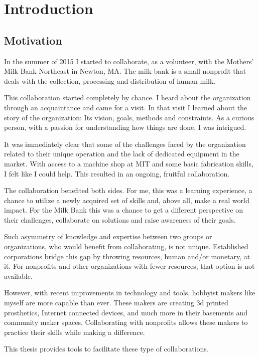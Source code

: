 \chapter{Introduction}
\label{chap_intro}

\section{Motivation}
In the summer of 2015 I started to collaborate, as a volunteer, with the Mothers’ Milk Bank Northeast in Newton, MA. The milk bank is a small nonprofit that deals with the collection, processing and distribution of human milk.

This collaboration started completely by chance. I heard about the organization through an acquaintance and came for a visit. In that visit I learned about the story of the organization: Its vision, goals, methods and constraints. As a curious person, with a passion for understanding how things are done, I was intrigued. 

It was immediately clear that some of the challenges faced by the organization related to their unique operation and the lack of dedicated equipment in the market. With access to a machine shop at MIT and some basic fabrication skills, I felt like I could help. This resulted in an ongoing, fruitful collaboration. 

The collaboration benefited both sides. For me, this was a learning experience, a chance to utilize a newly acquired set of skills and, above all, make a real world impact. For the Milk Bank this was a chance to get a different perspective on their challenges, collaborate on solutions and raise awareness of their goals.   

Such asymmetry of knowledge and expertise between two groups or organizations, who would benefit from collaborating, is not unique. Established corporations bridge this gap by throwing resources, human and/or monetary, at it. For nonprofits and other organizations with fewer resources, that option is not available.

However, with recent improvements in technology and tools, hobbyist makers like myself are more capable than ever. These makers are creating 3d printed prosthetics, Internet connected devices, and much more in their basements and community maker spaces. Collaborating with nonprofits allows these makers to practice their skills while making a difference. 

This thesis provides tools to facilitate these type of collaborations.


